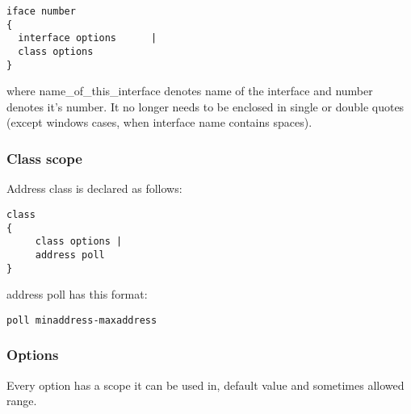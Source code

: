 \begin{verbatim}
iface number 
{
  interface options      |
  class options        
}
\end{verbatim}

where name\_of\_this\_interface denotes name of the interface and
number denotes it's number. It no longer needs to be enclosed in
single or double quotes (except windows cases, when interface name
contains spaces).

\subsubsection{Class scope}
Address class is declared as follows:

\begin{verbatim}
class
{  
     class options |
     address poll    
}
\end{verbatim}

address poll has this format:
\begin{verbatim}
poll minaddress-maxaddress
\end{verbatim}

\subsubsection{Options}

Every option has a scope it can be used in, default value and
sometimes allowed range.

